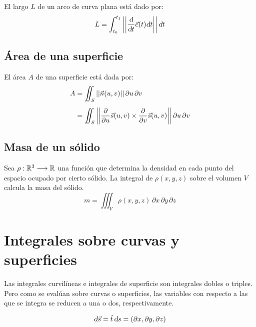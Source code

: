 El largo $L$ de un arco de curva plana está dado por:
\begin{equation*}
    L = \int_{t_0}^{t_1} {\left|\left| { \dfrac{\textsl{d}}{\textsl{d} t} \Vec{c}(t) \textsl{d} t } \right|\right|} \, \textsl{d} t
\end{equation*}


\subsection{Área de una superficie}

El área $A$ de una superficie está dada por:
\begin{align*}
    A &= \iint_S {\left|\left| {\Vec{n}(u,v)} \right|\right|} \, \partial u \, \partial v
    \\[1ex]
    &= \iint_S {\left|\left| { \dfrac{\partial}{\partial u} \Vec{s}(u,v) \times \dfrac{\partial}{\partial v} \Vec{s}(u,v) } \right|\right|} \, \partial u \, \partial v
\end{align*}


\subsection{Masa de un sólido}

Sea $\rho:\mathbb{R}^3 \longrightarrow \mathbb{R}$ una función que determina la densidad en cada punto del espacio ocupado por cierto sólido.
La integral de $\rho (x,y,z)$ sobre el volumen $V$ calcula la masa del sólido.
\begin{equation*}
    m = \iiint_V \rho (x,y,z) \, \partial x \, \partial y \, \partial z
\end{equation*}


\section{Integrales sobre curvas y superficies}

Las integrales curvilíneas e integrales de superficie son integrales dobles o triples.
Pero como se evalúan sobre curvas o superficies, las variables con respecto a las que se integra se reducen a una o dos, respectivamente.

\begin{mdframed}[style=DefinitionFrame]
    \begin{defn}
    \end{defn}
    \begin{equation*}
        \textsl{d} \Vec{s} = \hat{t} \, \textsl{d} s = \left( \partial x, \partial y, \partial z \right)
    \end{equation*}
\end{mdframed}

